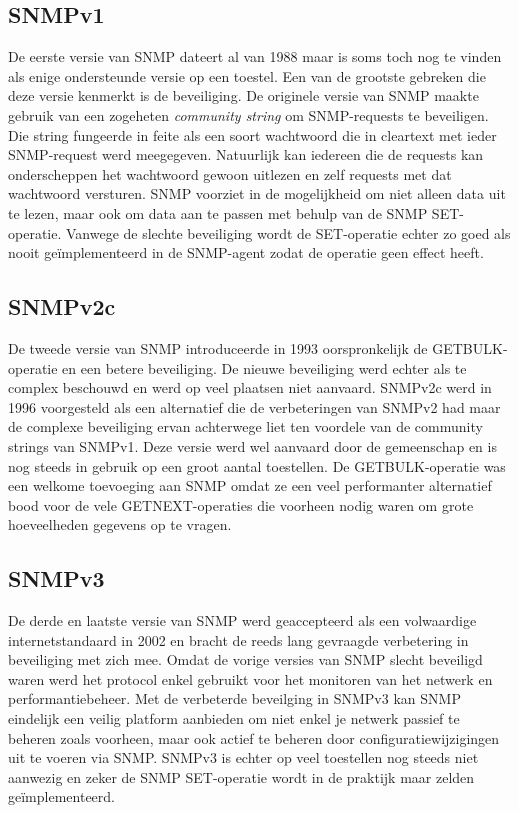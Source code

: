 \subsection{SNMPv1}
De eerste versie van SNMP dateert al van 1988 maar is soms toch nog te vinden als enige ondersteunde versie op een toestel.
Een van de grootste gebreken die deze versie kenmerkt is de beveiliging.
De originele versie van SNMP maakte gebruik van een zogeheten \emph{community string} om SNMP-requests te beveiligen.
Die string fungeerde in feite als een soort wachtwoord die in cleartext met ieder SNMP-request werd meegegeven\cite{snmp-wiki}.
Natuurlijk kan iedereen die de requests kan onderscheppen het wachtwoord gewoon uitlezen en zelf requests met dat wachtwoord versturen.
SNMP voorziet in de mogelijkheid om niet alleen data uit te lezen, maar ook om data aan te passen met behulp van de SNMP SET-operatie.
Vanwege de slechte beveiliging wordt de SET-operatie echter zo goed als nooit geïmplementeerd in de SNMP-agent zodat de operatie geen effect heeft.



\subsection{SNMPv2c}
De tweede versie van SNMP introduceerde in 1993 \cite{snmp-versions} oorspronkelijk de GETBULK-operatie en een betere beveiliging.
De nieuwe beveiliging werd echter als te complex beschouwd en werd op veel plaatsen niet aanvaard.
SNMPv2c werd in 1996 \cite{snmp-versions} voorgesteld als een alternatief die de verbeteringen van SNMPv2 had maar de complexe beveiliging ervan achterwege liet
ten voordele van de community strings van SNMPv1.
Deze versie werd wel aanvaard door de gemeenschap en is nog steeds in gebruik op een groot aantal toestellen.
De GETBULK-operatie was een welkome toevoeging aan SNMP omdat ze een veel performanter alternatief bood voor de vele GETNEXT-operaties
die voorheen nodig waren om grote hoeveelheden gegevens op te vragen.



\subsection{SNMPv3}
De derde en laatste versie van SNMP werd geaccepteerd als een volwaardige internetstandaard in 2002 \cite{snmpv3} en
bracht de reeds lang gevraagde verbetering in beveiliging met zich mee.
Omdat de vorige versies van SNMP slecht beveiligd waren werd het protocol enkel gebruikt voor het monitoren van het netwerk en performantiebeheer.
Met de verbeterde beveilging in SNMPv3 kan SNMP eindelijk een veilig platform aanbieden om niet enkel je netwerk passief te beheren zoals voorheen,
maar ook actief te beheren door configuratiewijzigingen uit te voeren via SNMP.
SNMPv3 is echter op veel toestellen nog steeds niet aanwezig en zeker de SNMP SET-operatie wordt in de praktijk maar zelden geïmplementeerd.

